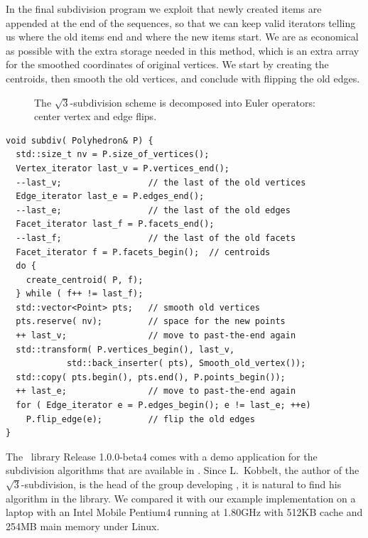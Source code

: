\noindent
In the final subdivision program we exploit that newly created items
are appended at the end of the sequences, so that we can keep valid
iterators telling us where the old items end and where the new items
start. We are as economical as possible with the extra
storage needed in this method, which is an extra array for the
smoothed coordinates of original vertices. We start by creating the
centroids, then smooth the old vertices, and conclude with flipping
the old edges.

\begin{figure}[tb]
    \caption{The $\sqrt{3}$-subdivision scheme is decomposed into
             Euler operators: center vertex and edge flips.}
    \label{fig:sqrt3_basic}%
\end{figure}


\begin{lstlisting}
void subdiv( Polyhedron& P) {
  std::size_t nv = P.size_of_vertices();
  Vertex_iterator last_v = P.vertices_end();
  --last_v;                 // the last of the old vertices
  Edge_iterator last_e = P.edges_end();
  --last_e;                 // the last of the old edges
  Facet_iterator last_f = P.facets_end();
  --last_f;                 // the last of the old facets
  Facet_iterator f = P.facets_begin();  // centroids
  do {
    create_centroid( P, f);
  } while ( f++ != last_f);
  std::vector<Point> pts;   // smooth old vertices
  pts.reserve( nv);         // space for the new points
  ++ last_v;                // move to past-the-end again
  std::transform( P.vertices_begin(), last_v, 
            std::back_inserter( pts), Smooth_old_vertex());
  std::copy( pts.begin(), pts.end(), P.points_begin());
  ++ last_e;                // move to past-the-end again
  for ( Edge_iterator e = P.edges_begin(); e != last_e; ++e)
    P.flip_edge(e);         // flip the old edges
}
\end{lstlisting}%

\noindent
The \openmesh\ library Release 1.0.0-beta4 comes with a demo
application for the subdivision algorithms that are available in
\openmesh. Since L.~Kobbelt, the author of the
$\sqrt{3}$-subdivision, is the head of the group developing \openmesh,
it is natural to find his algorithm in the library. We compared it
with our example implementation on a laptop with an Intel Mobile
Pentium4 running at 1.80GHz with 512KB cache and 254MB main memory
under Linux.


